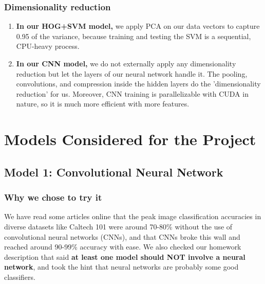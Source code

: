 \documentclass[10pt]{article} %
\begin{document}
\subsubsection{Dimensionality reduction}\begin{enumerate}
    \item \textbf{In our HOG+SVM model,} we apply PCA on our data vectors to capture 0.95 of the variance, because training and testing the SVM is a sequential, CPU-heavy process.
    \item \textbf{In our CNN model,} we do not externally apply any dimensionality reduction but let the layers of our neural network handle it. The pooling, convolutions, and compression inside the hidden layers do the 'dimensionality reduction' for us. Moreover, CNN training is parallelizable with CUDA in nature, so it is much more efficient with more features.
\end{enumerate}
\section{Models Considered for the Project}
\subsection{Model 1: Convolutional Neural Network}
\subsubsection{Why we chose to try it}
We have read some articles online that the peak image classification accuracies in diverse datasets like Caltech 101 were around 70-80\% without the use of convolutional neural networks (CNNs), and that CNNs broke this wall and reached around 90-99\% accuracy with ease. We also checked our homework description that said \textbf{at least one model should NOT involve a neural network}, and took the hint that neural networks are probably some good classifiers.
\end{document}
